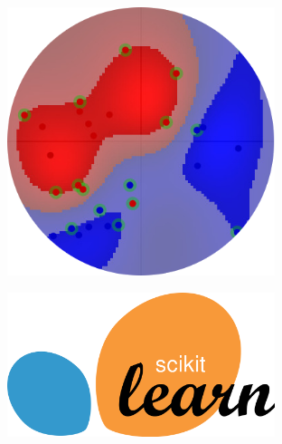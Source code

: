\documentclass{beamer}
\begin{document}
\begin{frame}
\begin{columns}
\begin{column}{0.33\textwidth}
\begin{figure}
			\end{figure}
		\end{column}
			\begin{column}{0.33\textwidth}
			\begin{figure}
				\vspace{-7em}
				\centering
				\includegraphics[width=0.8\textwidth]{img/lalolib.png}
			\end{figure}
			\begin{figure}
				\vspace{-2em}
				\centering
				\includegraphics[width=0.8\textwidth]{img/scikit-learn.png}
			\end{figure}
			

\end{column}
\end{columns}
\end{frame}
\end{document}
